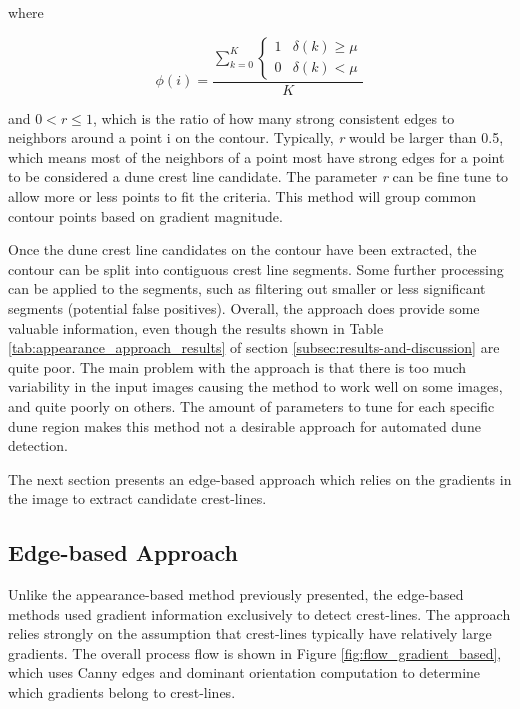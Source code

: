 where

\begin{equation}
\phi(i)=\frac{\sum_{k=0}^{K}\begin{cases}
		1 & \delta\left(k\right)\geq\mu\\
		0 & \delta\left(k\right)<\mu
	\end{cases}}{K}
\end{equation}

and $0 < r \leq1$, which is the ratio of how many strong consistent edges to neighbors around a point i on the contour. Typically, \emph{r} would be larger than 0.5, which means most of the neighbors of a point most have strong edges for a point to be considered a dune crest line candidate. The parameter \emph{r} can be fine tune to allow more or less points to fit the criteria. This method will group common contour points based on gradient magnitude.

Once the dune crest line candidates on the contour have been extracted, the contour can be split into contiguous crest line segments. Some further processing can be applied to the segments, such as filtering out smaller or less significant segments (potential false positives). Overall, the approach does provide some valuable information, even though the results shown in Table \ref{tab:appearance_approach_results} of section \ref{subsec:results-and-discussion} are quite poor. The main problem with the approach is that there is too much variability in the input images causing the method to work well on some images, and quite poorly on others. The amount of parameters to tune for each specific dune region makes this method not a desirable approach for automated dune detection.

The next section presents an edge-based approach which relies on the gradients in the image to extract candidate crest-lines.



\subsection{Edge-based Approach} \label{subsec:edge_based_detection}

Unlike the appearance-based method previously presented, the edge-based methods used gradient information exclusively to detect crest-lines. The approach relies strongly on the assumption that crest-lines typically have relatively large gradients. The overall process flow is shown in Figure \ref{fig:flow_gradient_based}, which uses Canny edges and dominant orientation computation to determine which gradients belong to crest-lines. 


